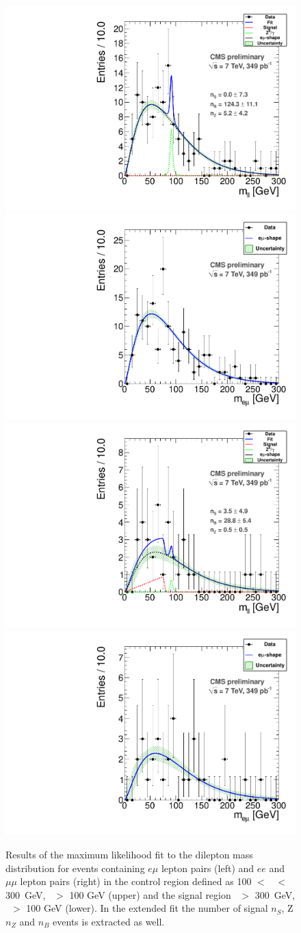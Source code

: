 \begin{figure}[hbt]
\begin{center}
\includegraphics[width=0.48\linewidth]{plots_final/fit2011_Control_Data.pdf}
\includegraphics[width=0.48\linewidth]{plots_final/fit2011OFOS_Control_Data.pdf}
\includegraphics[width=0.48\linewidth]{plots_final/fit2011_Signal_Data.pdf}
\includegraphics[width=0.48\linewidth]{plots_final/fit2011OFOS_Signal_Data.pdf}
\caption{\label{fig:dilmass}\protect 
Results of the maximum likelihood fit to the dilepton mass distribution for events containing 
$e\mu$ lepton pairs (left) and $ee$ and $\mu\mu$ lepton pairs (right) in the control
region defined as 100 $<$ \Ht\ $<$ 300~GeV, \MET\ $>$ 100 GeV (upper) and the signal region
\Ht\ $>$ 300~GeV, \MET\ $>$ 100 GeV (lower). In the extended fit the number of
signal $n_{S}$, Z $n_Z$ and \ttbar $n_B$ events is extracted as well.
}
\end{center}
\end{figure}

